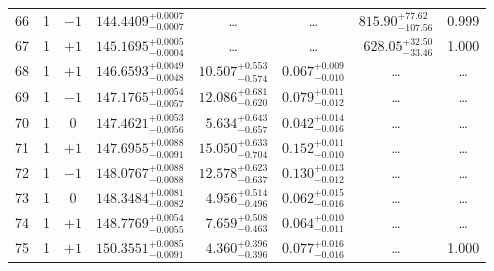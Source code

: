 \begin{table*}[!]
\begin{tabular}{llcrrlrc}
66 & 1 & $-1$ & $    144.4409_{-      0.0007}^{+      0.0007}$ & \multicolumn{1}{c}{\dots} & \multicolumn{1}{c}{\dots} & $      815.90_{-      107.56}^{+       77.62}$ & 0.999\\[1pt]
67 & 1 & $+1$ & $    145.1695_{-      0.0004}^{+      0.0005}$ & \multicolumn{1}{c}{\dots} & \multicolumn{1}{c}{\dots} & $      628.05_{-       33.46}^{+       32.50}$ & 1.000 \\[1pt]
68 & 1 & $+1$ & $    146.6593_{-      0.0048}^{+      0.0049}$ & $      10.507_{-       0.574}^{+       0.553}$ & $       0.067_{-       0.010}^{+       0.009}$ & \multicolumn{1}{c}{\dots} & \dots \\[1pt]
69 & 1 & $-1$ & $    147.1765_{-      0.0057}^{+      0.0054}$ & $      12.086_{-       0.620}^{+       0.681}$ & $       0.079_{-       0.012}^{+       0.011}$ & \multicolumn{1}{c}{\dots} & \dots \\[1pt]
70 & 1 & 0 & $    147.4621_{-      0.0056}^{+      0.0053}$ & $       5.634_{-       0.657}^{+       0.643}$ & $       0.042_{-       0.016}^{+       0.014}$ & \multicolumn{1}{c}{\dots} & \dots \\[1pt]
71 & 1 & $+1$ & $    147.6955_{-      0.0091}^{+      0.0088}$ & $      15.050_{-       0.704}^{+       0.633}$ & $       0.152_{-       0.010}^{+       0.011}$ & \multicolumn{1}{c}{\dots} & \dots \\[1pt]
72 & 1 & $-1$ & $    148.0767_{-      0.0088}^{+      0.0088}$ & $      12.578_{-       0.637}^{+       0.623}$ & $       0.130_{-       0.012}^{+       0.013}$ & \multicolumn{1}{c}{\dots} & \dots \\[1pt]
73 & 1 & 0 & $    148.3484_{-      0.0082}^{+      0.0081}$ & $       4.956_{-       0.496}^{+       0.514}$ & $       0.062_{-       0.016}^{+       0.015}$ & \multicolumn{1}{c}{\dots} & \dots \\[1pt]
74 & 1 & $+1$ & $    148.7769_{-      0.0055}^{+      0.0054}$ & $       7.659_{-       0.463}^{+       0.508}$ & $       0.064_{-       0.011}^{+       0.010}$ & \multicolumn{1}{c}{\dots} & \dots \\[1pt]
75 & 1 & $+1$ & $    150.3551_{-      0.0091}^{+      0.0085}$ & $       4.360_{-       0.396}^{+       0.396}$ & $       0.077_{-       0.016}^{+       0.016}$ & \multicolumn{1}{c}{\dots} & 1.000 \\[1pt]


\end{tabular}
\end{table*}
